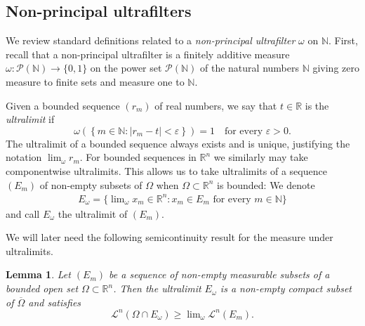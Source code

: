\documentclass[a4paper,leqno]{amsart}
\numberwithin{equation}{section}
\newtheorem{lemma}[theorem]{Lemma}
\theoremstyle{remark}
\theoremstyle{remark}
\newcommand{\N}{\mathbb{N}}
\newcommand{\R}{\mathbb{R}}
\newcommand{\lm}{\mathscr{L}}
\begin{document}
\subsection{Non-principal ultrafilters}\label{section-ultrafilters}
We review standard definitions related to a \emph{non-principal ultrafilter} $\omega$ on $\N$. First, recall that a non-principal ultrafilter is a finitely additive measure $\omega \colon \mathcal{P}( \mathbb{N} ) \rightarrow \{0,1\}$ on the power set $\mathcal{P}( \mathbb{N} )$ of the natural numbers $\mathbb{N}$ giving zero measure to finite sets and measure one to $\N$.

Given a bounded sequence $( r_m )$ of real numbers, we say that $t \in \mathbb{R}$ is the \emph{ultralimit} if
\begin{equation*}
    \omega\left(
    \left\{
        m \in \mathbb{N}
        \colon
        | r_m - t |
        <
        \varepsilon
    \right\}
    \right)
    =
    1
    \quad\text{for every $\varepsilon > 0$.}
\end{equation*}
The ultralimit of a bounded sequence always exists and is unique, justifying the notation $\lim_\omega r_m$. For bounded sequences in $\R^n$ we similarly may take componentwise ultralimits. This allows us to take ultralimits of a sequence $(E_m)$ of non-empty subsets of $\Omega$ when $\Omega \subset \R^n$ is bounded: We denote
\begin{align*}
    E_\omega = \{ \lim\nolimits_{\omega} x_m \in \R^n \colon \text{$x_m \in E_m$ for every $m \in \N$} \}
\end{align*}
and call $E_\omega$ the ultralimit of $(E_m)$.

We will later need the following semicontinuity result for the measure under ultralimits.
\begin{lemma}\label{lem:bound-ultralimit-set}
Let $(E_m)$ be a sequence of non-empty measurable subsets of a bounded open set $\Omega \subset \R^n$. Then the ultralimit $E_\omega$ is a non-empty compact subset of $\overline{\Omega}$ and satisfies $$\lm^n(\Omega\cap E_\omega) \geq \lim\nolimits_\omega \lm^n(E_m).$$
\end{lemma}
\end{document}
